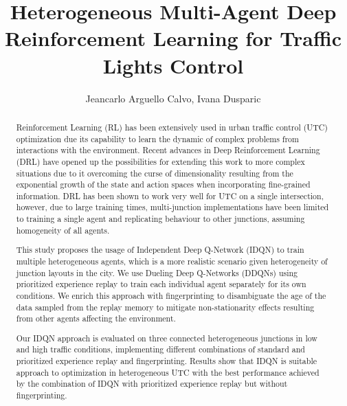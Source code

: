 \documentclass{llncs}
\title{Heterogeneous Multi-Agent Deep Reinforcement Learning for Traffic Lights Control}
\author{Jeancarlo Arguello Calvo, Ivana Dusparic}
\institute{School of Computer Science and Statistics, University of Dublin, Trinity College \\
\email{arguellj@tcd.ie, ivana.dusparic@scss.tcd.ie} }
\begin{document}
\maketitle

\begin{abstract}

Reinforcement Learning (RL) has been extensively used in urban traffic control (UTC) optimization due its capability to learn the dynamic of complex problems from interactions with the environment. Recent advances in Deep Reinforcement Learning (DRL) have opened up the possibilities for extending this work to more complex situations due to it overcoming the curse of dimensionality resulting from the exponential growth of the state and action spaces when incorporating fine-grained information. DRL has been shown to work very well for UTC on a single intersection, however, due to large training times, multi-junction implementations have been limited to training a single agent and replicating behaviour to other junctions, assuming homogeneity of all agents. 

This study proposes the usage of Independent Deep Q-Network (IDQN) to train multiple heterogeneous agents, which is a more realistic scenario given heterogeneity of junction layouts in the city. We use Dueling Deep Q-Networks (DDQNs) using prioritized experience replay to train each individual agent separately for its own conditions. We enrich this approach with fingerprinting to disambiguate the age of the data sampled from the replay memory to mitigate non-stationarity effects resulting from other agents affecting the environment. 

Our IDQN approach is evaluated on three connected heterogeneous junctions in low and high traffic conditions, implementing different combinations of standard and prioritized experience replay and fingerprinting. Results show that IDQN is suitable approach to optimization in heterogeneous UTC with the best performance achieved by the combination of IDQN with prioritized experience replay but without fingerprinting.  


\end{abstract}
\end{document}
